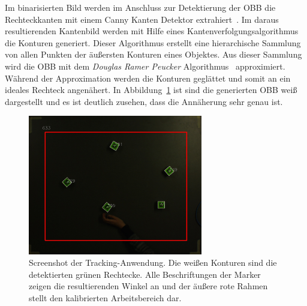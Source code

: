 Im binarisierten Bild werden im Anschluss zur Detektierung der OBB die Rechteckkanten mit einem Canny Kanten Detektor extrahiert~\cite{article:Canny}. Im daraus resultierenden Kantenbild werden mit Hilfe eines Kantenverfolgungsalgorithmus~\cite{article:FindConturs} die Konturen generiert. Dieser Algorithmus erstellt eine hierarchische Sammlung von allen Punkten der äußersten Konturen eines Objektes. Aus dieser Sammlung wird die OBB mit dem \textit{Douglas Ramer Peucker} Algorithmus~\cite{article:RamerPeucker} approximiert. Während der Approximation werden die Konturen geglättet und somit an ein ideales Rechteck angenähert. In Abbildung~\ref{fig:DebugScreenshot} ist sind die generierten OBB weiß dargestellt und es ist deutlich zusehen, dass die Annäherung sehr genau ist.
\begin{figure}[H]
	\centering
	\includegraphics[width=3in]{Bilder/TrackingScreenshot_x.jpg}
	\caption[Screenshot der Tracking-Anwendung]{Screenshot der Tracking-Anwendung. Die weißen Konturen sind die detektierten grünen Rechtecke. Alle Beschriftungen der Marker zeigen die resultierenden Winkel an und der äußere rote Rahmen stellt den kalibrierten Arbeitsbereich dar.}

	\label{fig:DebugScreenshot}
\end{figure}
